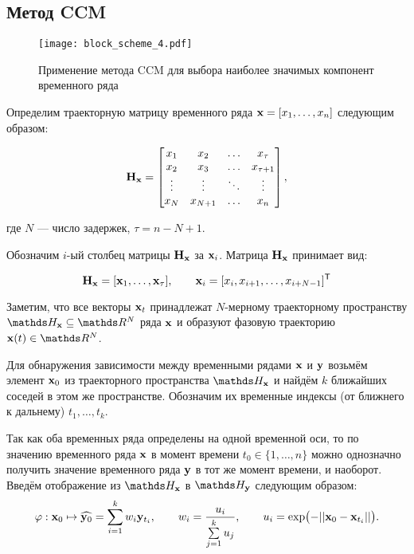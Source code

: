 \documentclass[a4paper, 12pt]{article}
\begin{document}
\subsection{Метод CCM}
\begin{figure}[bhtp]
	\texttt{[image: block\_scheme\_4.pdf]}
	\caption{Применение метода CCM для выбора наиболее значимых компонент временного ряда}
	\label{fig:schema}
\end{figure}

Определим траекторную матрицу временного ряда $\mathbf{x} = [x_1, \ldots, x_n]$ следующим образом: 

\begin{equation*} \label{eq:traj_mat}
	\mathbf{H}_{\mathbf{x}} = \begin{bmatrix}
		x_1 & x_2 & \ldots & x_{\tau} \\
		x_2 & x_3 & \ldots & x_{\tau+1} \\
		\vdots & \vdots & \ddots & \vdots \\
		x_{N} & x_{N+1} & \ldots & x_n
	\end{bmatrix}, 
\end{equation*} 

где $N$ --- число задержек, $\tau = n - N + 1$.

Обозначим $i\text{-ый}$ столбец матрицы $\mathbf{H}_{\mathbf{x}}$ за $\mathbf{x}_i$. 
Матрица $\mathbf{H}_{\mathbf{x}}$ принимает вид:

\begin{equation*} \label{eq:traj_mat_short}
	\mathbf{H}_{\mathbf{x}} = [\mathbf{x}_1, \ldots, \mathbf{x}_{\tau}], \qquad \mathbf{x}_i = [x_i, x_{i+1}, \ldots, x_{i+N-1}]^{\mathsf{T}} 
\end{equation*}

Заметим, что все векторы $\mathbf{x}_t$ принадлежат $N\text{-мерному}$ траекторному пространству $\dH_{\bx} \subseteq \dR^N$ ряда $\mathbf{x}$ и образуют фазовую траекторию $\bx(t) \in \dR^N$.

Для обнаружения зависимости между временными рядами $\mathbf{x}$ и $\mathbf{y}$ возьмём элемент $\mathbf{x}_0$ из траекторного пространства $\dH_{\bx}$ и найдём $k$ ближайших соседей в этом же пространстве. Обозначим их временные индексы (от ближнего к дальнему) $t_1, \ldots, t_k$.

Так как оба временных ряда определены на одной временной оси, то по значению временного ряда $\mathbf{x}$ в момент времени $t_0 \in \{ 1, \ldots, n\}$ можно однозначно получить значение временного ряда $\mathbf{y}$ в тот же момент времени, и наоборот. Введём отображение из $\dH_{\bx}$ в $\dH_{\by}$ следующим образом: 
$$ \varphi: \mathbf{x}_0 \mapsto \widehat{\mathbf{y}_0} = \sum\limits_{i=1}^k w_i \mathbf{y}_{t_i}, \qquad 
w_i = \dfrac{u_i}{\sum\limits_{j=1}^k u_j}, \qquad
u_i = \exp \bigl( -||\mathbf{x}_0 - \mathbf{x}_{t_i}|| \bigr).$$
\end{document}
